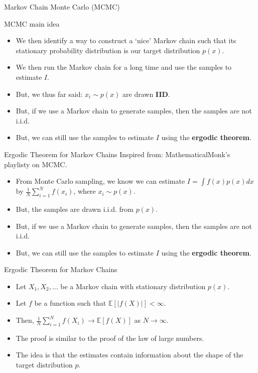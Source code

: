 \documentclass{beamer}
\begin{document}
\begin{section}{Markov Chain Monte Carlo (MCMC)}

    \begin{frame}{MCMC main idea}
        \begin{itemize}
            \item We then identify a way to construct a `nice' Markov chain such that its stationary probability distribution is our target distribution $p(x)$.
            \item We then run the Markov chain for a long time and use the samples to estimate $I$.
            \item But, we thus far said: $x_i \sim p(x)$ are drawn \textbf{IID}. 
            \item But, if we use a Markov chain to generate samples, then the samples are not i.i.d.
            \item But, we can still use the samples to estimate $I$ using the \textbf{ergodic theorem}.
        \end{itemize}
    \end{frame}
    


    \begin{frame}{Ergodic Theorem for Markov Chains}
        Inspired from: MathematicalMonk's playlisty on MCMC.

        \begin{itemize}
            \item From Monte Carlo sampling, we know we can estimate $I = \int f(x) p(x) dx$ by $\frac{1}{N} \sum_{i=1}^N f(x_i)$, where $x_i \sim p(x)$.
            \item But, the samples are drawn i.i.d. from $p(x)$.
            \item But, if we use a Markov chain to generate samples, then the samples are not i.i.d.
            \item But, we can still use the samples to estimate $I$ using the \textbf{ergodic theorem}.
        \end{itemize}
    \end{frame}
        
    \begin{frame}{Ergodic Theorem for Markov Chains}
        \begin{itemize}
            \item Let $X_1, X_2, \ldots$ be a Markov chain with stationary distribution $p(x)$.
            \item Let $f$ be a function such that $\mathbb{E}[|f(X)|] < \infty$.
            \item Then, $\frac{1}{N} \sum_{i=1}^N f(X_i) \rightarrow \mathbb{E}[f(X)]$ as $N \rightarrow \infty$.
            \item The proof is similar to the proof of the law of large numbers.
            \item The idea is that the estimates contain information about the shape of the target distribution $p$.
        \end{itemize}
    \end{frame}


\end{section}
\end{document}
